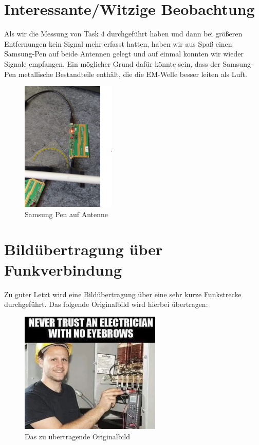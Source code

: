 \section{Interessante/Witzige Beobachtung}
Als wir die Messung von Task 4 durchgeführt haben und dann bei größeren Entfernungen kein Signal mehr erfasst hatten,
haben wir aus Spaß einen Samsung-Pen auf beide Antennen gelegt und auf einmal konnten wir wieder Signale empfangen.
Ein möglicher Grund dafür könnte sein, dass der Samsung-Pen metallische Bestandteile enthält,
die die EM-Welle besser leiten als Luft.

\begin{figure}[H]
    \centering
    \includegraphics[width=0.4\textwidth]{Pictures/stift.png}
    \caption{Samsung Pen auf Antenne}
\end{figure}

\clearpage

\section{Bildübertragung über Funkverbindung}
Zu guter Letzt wird eine Bildübertragung über eine sehr kurze Funkstrecke durchgeführt. Das folgende Originalbild wird hierbei übertragen:
\begin{figure}[H]
    \centering
    \includegraphics[width=0.6\textwidth]{Pictures/meme.jpg}
    \caption{Das zu übertragende Originalbild}
    \label{fig:Task2b}
\end{figure}

